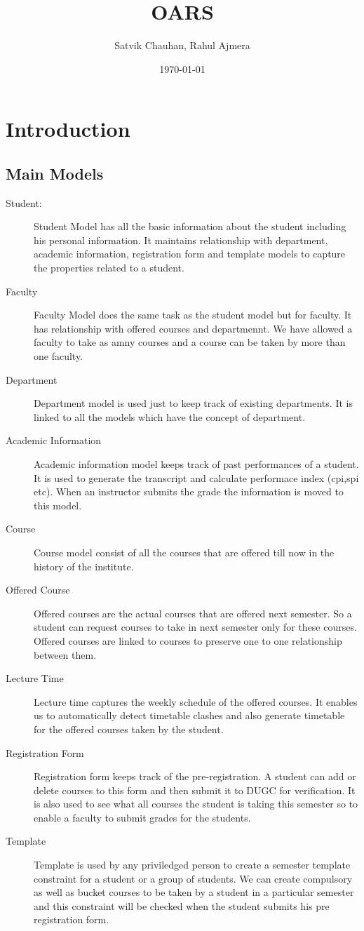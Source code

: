 \documentclass[letterpaper,12pt]{article}
\title{OARS}
\author{Satvik Chauhan, Rahul Ajmera}
\date{{\small \today}}
\begin{document}
\maketitle
\section{Introduction}


\subsection{Main Models}
\begin{description}
\item[Student:]
Student Model has all the basic information about the student including his
personal information. It maintains relationship with department, academic
information, registration form and template models to capture the properties
related to a student.
\item[Faculty]
Faculty Model does the same task as the student model but for faculty. It has
relationship with offered courses and departmennt. We have allowed a faculty
to take as amny courses and a course can be taken by more than one faculty.
\item[Department]
Department model is used just to keep track of existing departments. It is
linked to all the models which have the concept of department.
\item[Academic Information]
Academic information model keeps track of past performances of a student. It
is used to generate the transcript and calculate performace index (cpi,spi
etc). When an instructor submits the grade the information is moved to this
model.
\item[Course]
Course model consist of all the courses that are offered till now in the
history of the institute.
\item[Offered Course]
Offered courses are the actual courses that are offered next semester. So a
student can request courses to take in next semester only for these
courses. Offered courses are linked to courses to preserve one to one
relationship between them.
\item[Lecture Time]
Lecture time captures the weekly schedule of the offered courses. It enables
us to automatically detect timetable clashes and also generate timetable
for the offered courses taken by the student.
\item[Registration Form]
Registration form keeps track of the pre-registration. A student can add or
delete courses to this form and then submit it to DUGC for verification. It is
also used to see what all courses the student is taking this semester so to
enable a faculty to submit grades for the students.
\item[Template]
Template is used by any priviledged person to create a semester template
constraint for a student or a group of students. We can create compulsory as
well as bucket courses to be taken by a student in a particular semester and
this constraint will be checked when the student submits his pre registration
form.
\end{description}
\end{document}
